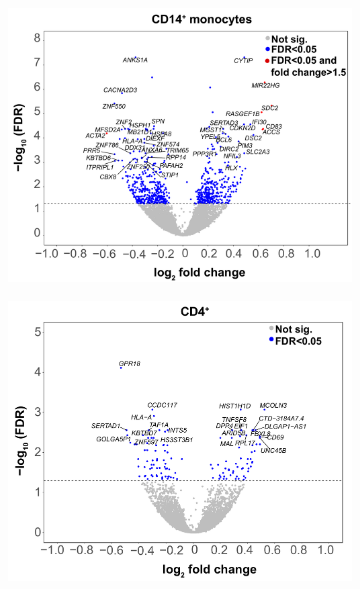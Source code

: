 \begin{figure}[htbp]
\centering
\begin{subfigure}{0.5\textwidth}
\centering
\includegraphics[width=\textwidth]{./Results2/pdfs/RNA_PS_CTL_CD14_volcano_plot}
\caption{\textbf{}}
\end{subfigure}%
\begin{subfigure}{0.5\textwidth}
\centering
\includegraphics[width=\textwidth]{./Results2/pdfs/RNA_PS_CTL_CD4_volcano_plot}
\caption{\textbf{}}
\end{subfigure}

\end{figure}

